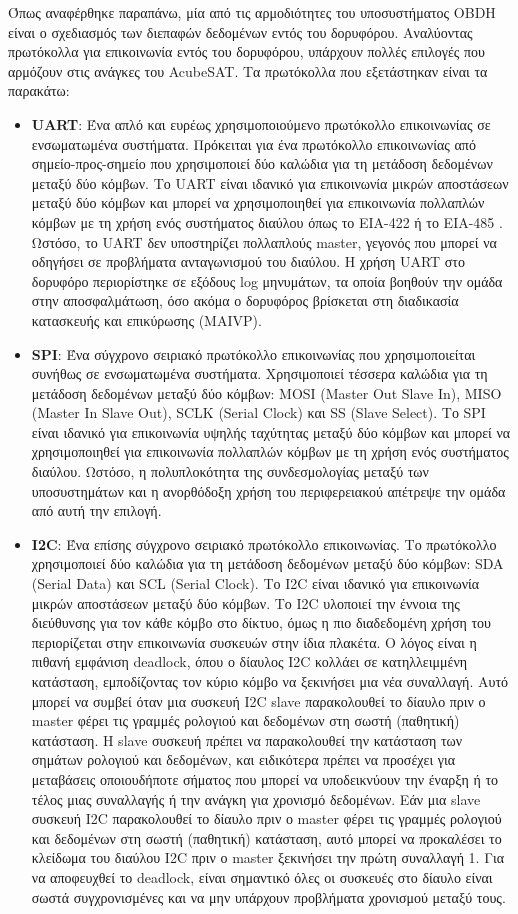 \documentclass[a4paper,nobib,justified]{tufte-book}
\begin{document}
Όπως αναφέρθηκε παραπάνω, μία από τις αρμοδιότητες του υποσυστήματος OBDH είναι ο σχεδιασμός των διεπαφών δεδομένων εντός του δορυφόρου. 
Αναλύοντας πρωτόκολλα για επικοινωνία εντός του δορυφόρου, υπάρχουν πολλές επιλογές που αρμόζουν στις ανάγκες του AcubeSAT. Τα πρωτόκολλα που εξετάστηκαν είναι τα παρακάτω:
\begin{itemize}
	\item \textbf{UART}: Ένα απλό και ευρέως χρησιμοποιούμενο πρωτόκολλο επικοινωνίας σε ενσωματωμένα συστήματα. Πρόκειται για ένα πρωτόκολλο επικοινωνίας από σημείο-προς-σημείο που χρησιμοποιεί δύο καλώδια για τη μετάδοση δεδομένων μεταξύ δύο κόμβων. Το UART είναι ιδανικό για επικοινωνία μικρών αποστάσεων μεταξύ δύο κόμβων και μπορεί να χρησιμοποιηθεί για επικοινωνία πολλαπλών κόμβων με τη χρήση ενός συστήματος διαύλου όπως το EIA-422 ή το EIA-485 \parencite{UARTNetworks}. Ωστόσο, το UART δεν υποστηρίζει πολλαπλούς master, γεγονός που μπορεί να οδηγήσει σε προβλήματα ανταγωνισμού του διαύλου. Η χρήση UART στο δορυφόρο περιορίστηκε σε εξόδους log μηνυμάτων, τα οποία βοηθούν την ομάδα στην αποσφαλμάτωση, όσο ακόμα ο δορυφόρος βρίσκεται στη διαδικασία κατασκευής και επικύρωσης (MAIVP).
	\item \textbf{SPI}: Ένα σύγχρονο σειριακό πρωτόκολλο επικοινωνίας που χρησιμοποιείται συνήθως σε ενσωματωμένα συστήματα. Χρησιμοποιεί τέσσερα καλώδια για τη μετάδοση δεδομένων μεταξύ δύο κόμβων: MOSI (Master Out Slave In), MISO (Master In Slave Out), SCLK (Serial Clock) και SS (Slave Select). Το SPI είναι ιδανικό για επικοινωνία υψηλής ταχύτητας μεταξύ δύο κόμβων και μπορεί να χρησιμοποιηθεί για επικοινωνία πολλαπλών κόμβων με τη χρήση ενός συστήματος διαύλου. Ωστόσο, η πολυπλοκότητα της συνδεσμολογίας μεταξύ των υποσυστημάτων και η ανορθόδοξη χρήση του περιφερειακού απέτρεψε την ομάδα από αυτή την επιλογή.
	\item \textbf{I2C}: Ένα επίσης σύγχρονο σειριακό πρωτόκολλο επικοινωνίας. Το πρωτόκολλο χρησιμοποιεί δύο καλώδια για τη μετάδοση δεδομένων μεταξύ δύο κόμβων: SDA (Serial Data) και SCL (Serial Clock). Το I2C είναι ιδανικό για επικοινωνία μικρών αποστάσεων μεταξύ δύο κόμβων. Το I2C υλοποιεί την έννοια της διεύθυνσης για τον κάθε κόμβο στο δίκτυο, όμως η πιο διαδεδομένη χρήση του περιορίζεται στην επικοινωνία συσκευών στην ίδια πλακέτα. Ο λόγος είναι η πιθανή εμφάνιση deadlock, όπου ο δίαυλος I2C κολλάει σε κατηλλειμμένη κατάσταση, εμποδίζοντας τον κύριο κόμβο να ξεκινήσει μια νέα συναλλαγή. Αυτό μπορεί να συμβεί όταν μια συσκευή I2C slave παρακολουθεί το δίαυλο πριν ο master φέρει τις γραμμές ρολογιού και δεδομένων στη σωστή (παθητική) κατάσταση. Η slave συσκευή πρέπει να παρακολουθεί την κατάσταση των σημάτων ρολογιού και δεδομένων, και ειδικότερα πρέπει να προσέχει για μεταβάσεις οποιουδήποτε σήματος που μπορεί να υποδεικνύουν την έναρξη ή το τέλος μιας συναλλαγής ή την ανάγκη για χρονισμό δεδομένων. Εάν μια slave συσκευή I2C παρακολουθεί το δίαυλο πριν ο master φέρει τις γραμμές ρολογιού και δεδομένων στη σωστή (παθητική) κατάσταση, αυτό μπορεί να προκαλέσει το κλείδωμα του διαύλου I2C πριν ο master ξεκινήσει την πρώτη συναλλαγή 1. Για να αποφευχθεί το deadlock, είναι σημαντικό όλες οι συσκευές στο δίαυλο είναι σωστά συγχρονισμένες και να μην υπάρχουν προβλήματα χρονισμού μεταξύ τους.

\end{itemize}
\end{document}
